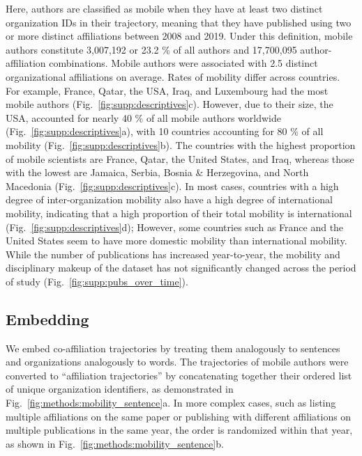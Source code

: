 \documentclass[12pt]{article} %
\begin{document}
Here, authors are classified as mobile when they have at least two distinct organization IDs in their trajectory, meaning that they have published using two or more distinct affiliations between 2008 and 2019.
Under this definition, mobile authors constitute 3,007,192 or 23.2 \% of all authors and 17,700,095 author-affiliation combinations.
Mobile authors were associated with 2.5 distinct organizational affiliations on average.
Rates of mobility differ across countries.
For example, France, Qatar, the USA, Iraq, and Luxembourg had the most mobile authors (Fig.~\ref{fig:supp:descriptives}c).
However, due to their size, the USA, accounted for nearly 40 \% of all mobile authors worldwide (Fig.~\ref{fig:supp:descriptives}a), with 10 countries accounting for 80 \% of all mobility (Fig.~\ref{fig:supp:descriptives}b).
The countries with the highest proportion of mobile scientists are France, Qatar, the United States, and Iraq, whereas those with the lowest are Jamaica, Serbia, Bosnia \& Herzegovina, and North Macedonia (Fig.~\ref{fig:supp:descriptives}c).
In most cases, countries with a high degree of inter-organization mobility also have a high degree of international mobility, indicating that a high proportion of their total mobility is international (Fig.~\ref{fig:supp:descriptives}d);
However, some countries such as France and the United States seem to have more domestic mobility than international mobility.
While the number of publications has increased year-to-year, the mobility and disciplinary makeup of the dataset has not significantly changed across the period of study (Fig.~\ref{fig:supp:pubs_over_time}).




\subsection*{Embedding}
We embed co-affiliation trajectories by treating them analogously to sentences and organizations analogously to words.
The trajectories of mobile authors were converted to ``affiliation trajectories'' by concatenating together their ordered list of unique organization identifiers, as demonstrated in Fig.~\ref{fig:methods:mobility_sentence}a.
In more complex cases, such as listing multiple affiliations on the same paper or publishing with different affiliations on multiple publications in the same year, the order is randomized within that year, as shown in  Fig.~\ref{fig:methods:mobility_sentence}b.
\end{document}
